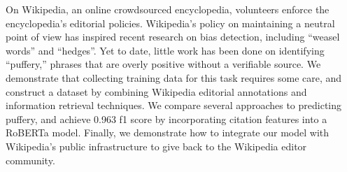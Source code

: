 On Wikipedia, an online crowdsourced encyclopedia, volunteers enforce the encyclopedia's editorial policies. Wikipedia's policy on maintaining a neutral point of view has inspired recent research on bias detection, including ``weasel words'' and ``hedges''. Yet to date, little work has been done on identifying ``puffery,'' phrases that are overly positive without a verifiable source. We demonstrate that collecting training data for this task requires some care, and construct a dataset by combining Wikipedia editorial annotations and information retrieval techniques. We compare several approaches to predicting puffery, and achieve 0.963 f1 score by incorporating citation features into a RoBERTa model. Finally, we demonstrate how to integrate our model with Wikipedia's public infrastructure to give back to the Wikipedia editor community.
